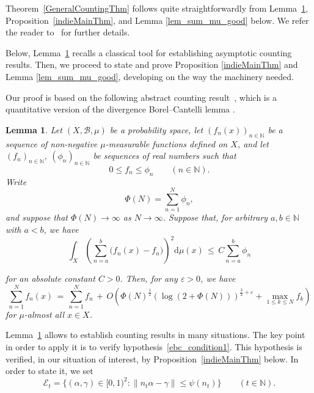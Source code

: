 \documentclass[12pt, reqno]{amsart}
\newtheorem{lemma}[thm]{Lemma}
\theoremstyle{definition}
\theoremstyle{remark}
\numberwithin{equation}{section}
\newcommand{\N}{\mathbb{N}}
\newcommand{\ca}[1]{\mathcal{#1}}
\def\alp{{\alpha}} \def\bfalp{{\boldsymbol \alpha}}
\def\gam{{\gamma}} \def\Gam{{\Gamma}}
\def\le{\leqslant} \def\ge{\geqslant}
\def\leq{\leqslant}
\def \bN {\mathbb N}
\def \cE {\mathcal E}
\begin{document}
Theorem~\ref{GeneralCountingThm} follows quite straightforwardly from Lemma~\ref{ebc}, Proposition~\ref{indieMainThm}, and Lemma \ref{lem_sum_mu_good} below. We refer the reader to~\cite[\S 3.3]{PVZZ2022} for further details.

Below, Lemma~\ref{ebc} recalls a classical tool for establishing asymptotic counting results. Then, we proceed to state and prove Proposition \ref{indieMainThm} and Lemma \ref{lem_sum_mu_good}, developing on the way the machinery needed.

Our proof is based on the following abstract counting result~\cite[Lemma~1.5]{harman}, which is a quantitative version of the divergence Borel--Cantelli lemma \cite{BV2023}.

\begin{lemma}\label{ebc}
Let $(X,\ca{B},\mu)$ be a probability space, let $(f_n(x))_{n \in \N}$ be a sequence of non-negative $\mu$-measurable functions defined on $X$, and let $(f_n)_{n \in \N },\ (\phi_n)_{n  \in \N}$ be sequences of real numbers  such that
\[
0\leq f_n \leq \phi_n \qquad (n \in \bN).
\]
Write
$$
\Phi(N)= \sum \limits_{n=1}^{N}\phi_n,
$$
and suppose that $\Phi(N) \to \infty$ as $N \to \infty$.
Suppose that, for arbitrary  $a,b \in \N$ with $a <  b$, we have
\begin{equation} \label{ebc_condition1}
\int_{X} \left(\sum_{n=a}^{b} \big( f_n(x) -  f_n \big) \right)^2\mathrm{d}\mu(x)\, \leq\,  C\!\sum_{n=a}^{b}\phi_n
\end{equation}

\noindent for an absolute constant $C>0$. Then, for any $\varepsilon>0$,  we have
\begin{equation} \label{ebc_conclusion}
\sum_{n=1}^N f_n(x)\, =\, \sum_{n=1}^{N}f_n\, +\, O\left(\Phi(N)^{\frac12}(\log(2+\Phi(N)))^{\frac{3}{2}+\varepsilon}+\max_{1\leq k\leq N}f_k\right)
\end{equation}
for $\mu$-almost all $x\in X$. %
\end{lemma}

Lemma~\ref{ebc} allows to establish counting results in many situations. The key point in order to apply it is to verify hypothesis~\eqref{ebc_condition1}. This hypothesis is verified, in our situation of interest, by Proposition~\ref{indieMainThm} below. In order
to state it, we set
\begin{equation} \label{Et_def}
\cE_t = \{ (\alp, \gam) \in [0,1)^2: \| n_t \alp - \gam \| \le \psi(n_t) \}
\qquad (t \in \bN).
\end{equation}
\end{document}
